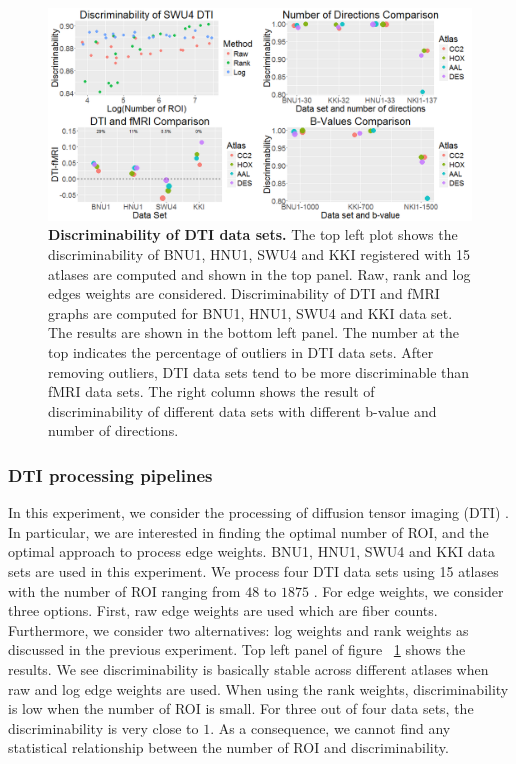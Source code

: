 \documentclass{article}
\begin{document}
\begin{figure}[H]
	\includegraphics[width=\linewidth]{../Figs/comb_dti.png}
	\caption{{ \bf Discriminability of DTI data sets.} The top left plot shows the discriminability of BNU1, HNU1, SWU4 and KKI registered with 15 atlases are computed and shown in the top panel. Raw, rank and log edges weights are considered. Discriminability of DTI and fMRI graphs are computed for BNU1, HNU1, SWU4 and KKI data set. The results are shown in the bottom left panel. The number at the top indicates the percentage of outliers in DTI data sets. After removing outliers, DTI data sets tend to be more discriminable than fMRI data sets. The right column shows the result of discriminability of different data sets with different b-value and number of directions.}
	\label{fig:comb_dti}
\end{figure}


\subsubsection{DTI processing pipelines}
In this experiment, we consider the processing of diffusion tensor imaging (DTI) \cite{westin2002processing}. In particular, we are interested in finding the optimal number of ROI, and the optimal approach to process edge weights. BNU1, HNU1, SWU4 and KKI data sets are used in this experiment. We process four DTI data sets using 15 atlases with the number of ROI ranging from $48$ to $1875$ \cite{mori2005mri}. For edge weights, we consider three options. First, raw edge weights are used which are fiber counts. Furthermore, we consider two alternatives: log weights and rank weights as discussed in the previous experiment. Top left panel of figure ~\ref{fig:comb_dti} shows the results. We see discriminability is basically stable across different atlases when raw and log edge weights are used. When using the rank weights, discriminability is low when the number of ROI is small. For three out of four data sets, the discriminability is very close to $1$. As a consequence, we cannot find any statistical relationship between the number of ROI and discriminability.
\end{document}
